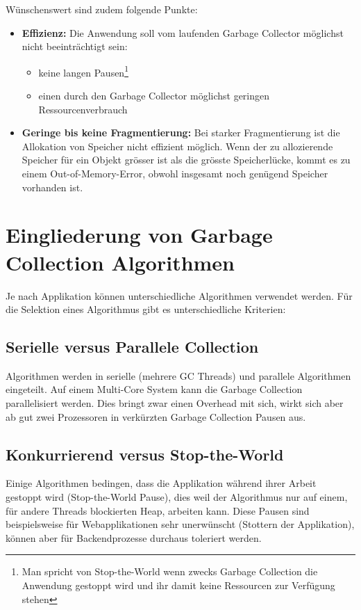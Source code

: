 Wünschenswert sind zudem folgende Punkte\cite[S. 4]{sunMemoryManagementWP}:
\begin{itemize}
	\item \textbf{Effizienz:} Die Anwendung soll vom laufenden Garbage Collector möglichst nicht beeinträchtigt sein: 
		\begin{itemize}
			\item keine langen Pausen\footnote{Man spricht von Stop-the-World wenn zwecks Garbage Collection die Anwendung gestoppt wird und ihr damit keine Ressourcen zur Verfügung stehen}
			\item einen durch den Garbage Collector möglichst geringen Ressourcenverbrauch
		\end{itemize}
	\item \textbf{Geringe bis keine Fragmentierung:} Bei starker Fragmentierung ist die Allokation von Speicher nicht effizient möglich. Wenn der zu allozierende Speicher für ein Objekt grösser ist als die grösste Speicherlücke, kommt es zu einem Out-of-Memory-Error, obwohl insgesamt noch genügend Speicher vorhanden ist. 
\end{itemize}

\section{Eingliederung von Garbage Collection Algorithmen}
Je nach Applikation können unterschiedliche Algorithmen verwendet werden. Für die Selektion eines Algorithmus gibt es unterschiedliche Kriterien\cite[S. 5]{sunMemoryManagementWP}:
\subsection{Serielle versus Parallele Collection}
Algorithmen werden in serielle (mehrere GC Threads) und parallele Algorithmen eingeteilt.
Auf einem Multi-Core System kann die Garbage Collection parallelisiert werden. Dies bringt zwar einen Overhead mit sich, wirkt sich aber ab gut zwei Prozessoren in verkürzten Garbage Collection Pausen aus.

\subsection{Konkurrierend versus Stop-the-World}
Einige Algorithmen bedingen, dass die Applikation während ihrer Arbeit gestoppt wird (Stop-the-World Pause), dies weil der Algorithmus nur auf einem, für andere Threads blockierten Heap, arbeiten kann. Diese Pausen sind beispielsweise für Webapplikationen sehr unerwünscht (Stottern der Applikation), können aber für Backendprozesse durchaus toleriert werden.


